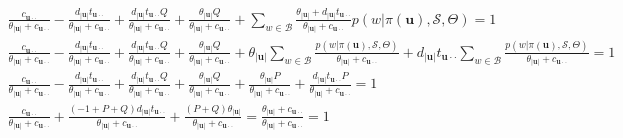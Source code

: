 \begin{equation}
\begin{split}
    \frac{c_{\mathbf{u}\cdot\cdot}}{\theta_{|\mathbf{u}|}+c_{\mathbf{u}\cdot\cdot}} - \frac{d_{|\mathbf{u}|}t_{\mathbf{u}\cdot\cdot}}{\theta_{|\mathbf{u}|}+c_{\mathbf{u}\cdot\cdot}} +  \frac{d_{|\mathbf{u}|}t_{\mathbf{u}\cdot\cdot}Q}{\theta_{|\mathbf{u}|}+c_{\mathbf{u}\cdot\cdot}} + \frac{\theta_{|\mathbf{u}|}Q}{\theta_{|\mathbf{u}|}+c_{\mathbf{u}\cdot\cdot}} + \sum_{w\in\mathcal{B}}\frac{\theta_{|\mathbf{u}|} + d_{|\mathbf{u}|}t_{\mathbf{u}\cdot\cdot}}{\theta_{|\mathbf{u}|}+c_{\mathbf{u}\cdot\cdot}} p(w | \pi(\mathbf{u}), \mathcal{S}, \Theta)= 1 \\
    \frac{c_{\mathbf{u}\cdot\cdot}}{\theta_{|\mathbf{u}|}+c_{\mathbf{u}\cdot\cdot}} - \frac{d_{|\mathbf{u}|}t_{\mathbf{u}\cdot\cdot}}{\theta_{|\mathbf{u}|}+c_{\mathbf{u}\cdot\cdot}} +  \frac{d_{|\mathbf{u}|}t_{\mathbf{u}\cdot\cdot}Q}{\theta_{|\mathbf{u}|}+c_{\mathbf{u}\cdot\cdot}} + \frac{\theta_{|\mathbf{u}|}Q}{\theta_{|\mathbf{u}|}+c_{\mathbf{u}\cdot\cdot}} + \theta_{|\mathbf{u}|}\sum_{w\in\mathcal{B}}\frac{p(w | \pi(\mathbf{u}), \mathcal{S}, \Theta)}{\theta_{|\mathbf{u}|}+c_{\mathbf{u}\cdot\cdot}}  + d_{|\mathbf{u}|}t_{\mathbf{u}\cdot\cdot}\sum_{w\in\mathcal{B}}\frac{ p(w | \pi(\mathbf{u}), \mathcal{S}, \Theta)}{\theta_{|\mathbf{u}|}+c_{\mathbf{u}\cdot\cdot}}= 1 \\ 
    \frac{c_{\mathbf{u}\cdot\cdot}}{\theta_{|\mathbf{u}|}+c_{\mathbf{u}\cdot\cdot}} - \frac{d_{|\mathbf{u}|}t_{\mathbf{u}\cdot\cdot}}{\theta_{|\mathbf{u}|}+c_{\mathbf{u}\cdot\cdot}} +  \frac{d_{|\mathbf{u}|}t_{\mathbf{u}\cdot\cdot}Q}{\theta_{|\mathbf{u}|}+c_{\mathbf{u}\cdot\cdot}} + \frac{\theta_{|\mathbf{u}|}Q}{\theta_{|\mathbf{u}|}+c_{\mathbf{u}\cdot\cdot}} + \frac{\theta_{|\mathbf{u}|}P}{\theta_{|\mathbf{u}|}+c_{\mathbf{u}\cdot\cdot}}  + \frac{ d_{|\mathbf{u}|}t_{\mathbf{u}\cdot\cdot}P}{\theta_{|\mathbf{u}|}+c_{\mathbf{u}\cdot\cdot}}= 1 \\
    \frac{c_{\mathbf{u}\cdot\cdot}}{\theta_{|\mathbf{u}|}+c_{\mathbf{u}\cdot\cdot}} + \frac{(-1+P+Q)d_{|\mathbf{u}|}t_{\mathbf{u}\cdot\cdot}}{\theta_{|\mathbf{u}|}+c_{\mathbf{u}\cdot\cdot}} +  \frac{(P+Q)\theta_{|\mathbf{u}|}}{\theta_{|\mathbf{u}|}+c_{\mathbf{u}\cdot\cdot}} = \frac{\theta_{|\mathbf{u}|} + c_{\mathbf{u}\cdot\cdot}}{\theta_{|\mathbf{u}|}+c_{\mathbf{u}\cdot\cdot}}  = 1
\end{split}
\end{equation}

